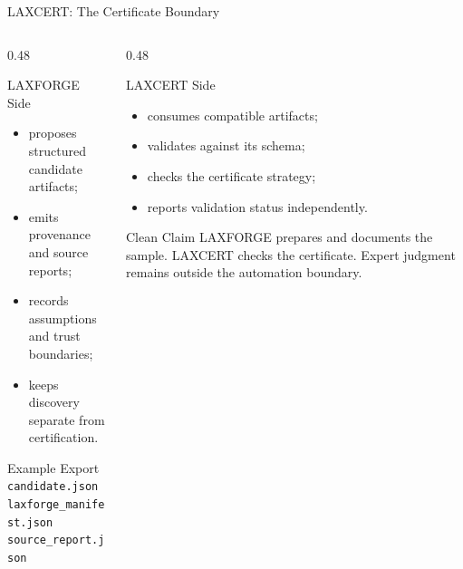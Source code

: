 \documentclass[aspectratio=169,11pt]{beamer}
\begin{document}
\begin{frame}{LAXCERT: The Certificate Boundary}
  \begin{columns}[T,totalwidth=\textwidth]
    \begin{column}{0.48\textwidth}
      \begin{block}{LAXFORGE Side}
        \begin{itemize}
          \item proposes structured candidate artifacts;
          \item emits provenance and source reports;
          \item records assumptions and trust boundaries;
          \item keeps discovery separate from certification.
        \end{itemize}
      \end{block}
      \begin{block}{Example Export}
        \texttt{candidate.json}\\
        \texttt{laxforge\_manifest.json}\\
        \texttt{source\_report.json}
      \end{block}
    \end{column}
    \begin{column}{0.48\textwidth}
      \begin{block}{LAXCERT Side}
        \begin{itemize}
          \item consumes compatible artifacts;
          \item validates against its schema;
          \item checks the certificate strategy;
          \item reports validation status independently.
        \end{itemize}
      \end{block}
      \begin{alertblock}{Clean Claim}
        LAXFORGE prepares and documents the sample. LAXCERT checks the
        certificate. Expert judgment remains outside the automation boundary.
      \end{alertblock}
    \end{column}
  \end{columns}
\end{frame}
\end{document}
